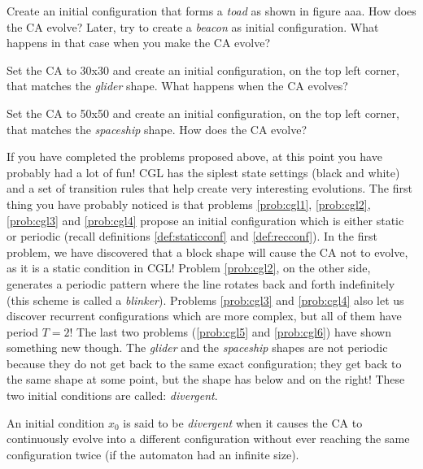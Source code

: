 \begin{problem}
\label{prob:cgl4}
Create an initial configuration that forms a \textit{toad} as shown in figure aaa.
How does the CA evolve?
Later, try to create a \textit{beacon} as initial configuration. What happens in that
case when you make the CA evolve?
\end{problem}

\begin{problem}
\label{prob:cgl5}
Set the CA to 30x30 and create an initial configuration, on the top left corner, that
matches the \textit{glider} shape. What happens when the CA evolves?
\end{problem}

\begin{problem}
\label{prob:cgl6}
Set the CA to 50x50 and create an initial configuration, on the top left corner, that
matches the \textit{spaceship} shape. How does the CA evolve?
\end{problem}

If you have completed the problems proposed above, at this point you have probably had
a lot of fun! CGL has the siplest state settings (black and white) and a set of
transition rules that help create very interesting evolutions. The first thing you have probably
noticed is that problems \ref{prob:cgl1}, \ref{prob:cgl2}, \ref{prob:cgl3} and \ref{prob:cgl4}
propose an initial configuration which is either static or periodic (recall definitions
\ref{def:staticconf} and \ref{def:recconf}). 
In the first problem, we have discovered that a block shape will cause the CA not to evolve,
as it is a static condition in CGL!
Problem \ref{prob:cgl2}, on the other side, generates a periodic pattern where the line rotates
back and forth indefinitely (this scheme is called a \textit{blinker}). Problems
\ref{prob:cgl3} and \ref{prob:cgl4} also let us discover recurrent configurations which are more
complex, but all of them have period $T=2$!
The last two problems (\ref{prob:cgl5} and \ref{prob:cgl6}) have shown something new though. The
\textit{glider} and the \textit{spaceship} shapes are not periodic because they do not get back
to the same exact configuration; they get back to the same shape at some point, but the shape has
below and on the right! These two initial conditions are called: \textit{divergent}.

\begin{definition}
\label{def:divconf}
An initial condition $x_0$ is said to be
\textit{divergent} when it causes the CA to continuously evolve
into a different configuration without ever reaching the same configuration twice
(if the automaton had an infinite size).
\end{definition}

